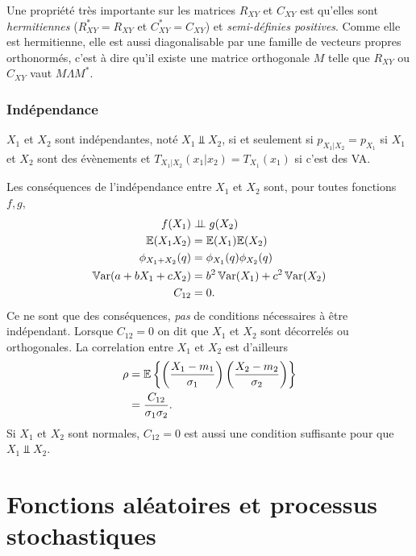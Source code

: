 Une propriété très importante sur les matrices $R_{XY}$ et $C_{XY}$ est
qu'elles sont \emph{hermitiennes} ($R_{XY}^* = R_{XY}$ et $C_{XY}^* = C_{XY}$)
et \emph{semi-définies positives}.
Comme elle est hermitienne, elle est aussi diagonalisable par une famille
de vecteurs propres orthonormés,
c'est à dire qu'il existe une matrice orthogonale $M$ telle que
$R_{XY}$ ou $C_{XY}$ vaut $M \Lambda M^*$.

\subsubsection{Indépendance}
$X_1$ et $X_2$ sont indépendantes, noté $X_1 \Perp X_2$,
si et seulement si $p_{X_1|X_2} = p_{X_1}$ si $X_1$ et $X_2$ sont des évènements et
$T_{X_1|X_2} (x_1|x_2) = T_{X_1}(x_1)$ si c'est des VA.

Les conséquences de l'indépendance entre $X_1$ et $X_2$ sont,
pour toutes fonctions $f, g$,
\begin{align*}
  f(X_1) & \perp\!\!\!\perp g(X_2)\\
  \mathbb{E}(X_1 X_2) & = \mathbb{E}(X_1) \mathbb{E}(X_2)\\
  \phi_{X_1 + X_2}(q) & = \phi_{X_1}(q) \phi_{X_2}(q)\\
  \operatorname{\mathbb{V}ar}(a + bX_1 + cX_2) & = b^2\operatorname{\mathbb{V}ar}(X_1) + c^2\operatorname{\mathbb{V}ar}(X_2)\\
  C_{12} & = 0.
\end{align*}
Ce ne sont que des conséquences, \emph{pas} de conditions nécessaires
à être indépendant.
Lorsque $C_{12} = 0$ on dit que $X_1$ et $X_2$ sont décorrelés ou orthogonales.
La correlation entre $X_1$ et $X_2$ est d'ailleurs
\begin{align*}
  \rho & = \mathbb{E}\left\{\left(\frac{X_1-m_1}{\sigma_1}\right)\left(\frac{X_2-m_2}{\sigma_2}\right)\right\}\\
       & = \frac{C_{12}}{\sigma_1\sigma_2}.
\end{align*}
Si $X_1$ et $X_2$ sont normales, $C_{12} = 0$ est aussi une condition
suffisante pour que $X_1 \Perp X_2$.

\section{Fonctions aléatoires et processus stochastiques}
